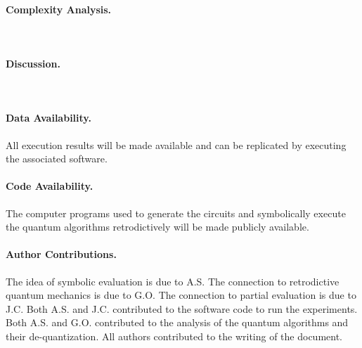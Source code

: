 \documentclass{article}
\newcommand{\red}[1]{{\color{red}{#1}}}
\newcommand{\todo}[1]{\fbox{\begin{minipage}{40em}{\red{#1}}\end{minipage}}}
\begin{document}
\begin{refsection}
\paragraph*{Complexity Analysis.}

~

\todo{ one pass over circuit BUT size of circuit may be exponential
  and complexity of normalizing to ANF not trivial
}

\paragraph*{Discussion.}

~

\todo{

observer 1 measures wires a,b; obs2 measures wires b,c; not commuting;
each obs gives partial solution to equations; but partial solutions
cannot lead to a global solution
 
KS suggests that equations do not have unique solutions; only
materialize when you measure;

can associate a probability with each variable in a equation: look at
all solutions and see the contribution of each variable to these
solutions.

}

\paragraph*{Data Availability.}
All execution results will be made available and can be replicated by
executing the associated software.

\paragraph*{Code Availability.}
The computer programs used to generate the circuits and symbolically
execute the quantum algorithms retrodictively will be made publicly
available.

\paragraph*{Author Contributions.}
The idea of symbolic evaluation is due to A.S. The connection to
retrodictive quantum mechanics is due to G.O. The connection to
partial evaluation is due to J.C. Both A.S. and J.C. contributed to
the software code to run the experiments. Both A.S. and
G.O. contributed to the analysis of the quantum algorithms and their
de-quantization. All authors contributed to the writing of the
document.


\end{refsection}
\end{document}

